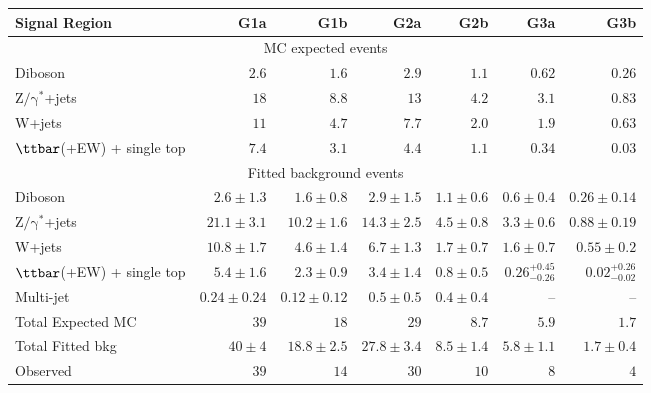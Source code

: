 \begin{table}[tbp]
\begin{center}
\begin{tabular}{|lrrrrrr|}
\hline
Signal Region & \textbf{ G1a } & \textbf{ G1b } & \textbf{ G2a } & \textbf{ G2b } & \textbf{ G3a } & \textbf{ G3b } \\
\hline
\multicolumn{7}{|c|}{MC expected events} \\ \hline
Diboson &  $2.6$               &  $1.6$               &  $2.9$               &  $1.1$               &  $0.62$               &  $0.26$               \\
$\mathrm{Z/\gamma^{*}}$+jets &  $18$               &  $8.8$               &  $13$               &  $4.2$               &  $3.1$               &  $0.83$               \\
W+jets &  $11$               &  $4.7$               &  $7.7$               &  $2.0$               &  $1.9$               &  $0.63$               \\
$\ttbar$(+EW) + single top &  $7.4$               &  $3.1$               &  $4.4$               &  $1.1$               &  $0.34$               &  $0.03$               \\
\hline
\multicolumn{7}{|c|}{Fitted background events} \\ \hline
Diboson & $2.6 \pm 1.3$ & $1.6 \pm 0.8$ & $2.9 \pm 1.5$ & $1.1 \pm 0.6$ & $0.6 \pm 0.4$ & $0.26 \pm 0.14$ \\
$\mathrm{Z/\gamma^{*}}$+jets & $21.1 \pm 3.1$ & $10.2 \pm 1.6$ & $14.3 \pm 2.5$ & $4.5 \pm 0.8$ & $3.3 \pm 0.6$ & $0.88 \pm 0.19$ \\
W+jets & $10.8 \pm 1.7$ & $4.6 \pm 1.4$ & $6.7 \pm 1.3$ & $1.7 \pm 0.7$ & $1.6 \pm 0.7$ & $0.55 \pm 0.2$ \\
$\ttbar$(+EW) + single top & $5.4 \pm 1.6$ & $2.3 \pm 0.9$ & $3.4 \pm 1.4$ & $0.8 \pm 0.5$ &  $0.26_{-0.26}^{+0.45}$               &  $0.02_{-0.02}^{+0.26}$               \\
Multi-jet & $0.24 \pm 0.24$ & $0.12 \pm 0.12$ & $0.5 \pm 0.5$ & $0.4 \pm 0.4$ & -- & -- \\
\hline
Total Expected MC &  $39$               &  $18$               &  $29$               &  $8.7$               &  $5.9$               &  $1.7$               \\
\hline
Total Fitted bkg & $40 \pm 4$ & $18.8 \pm 2.5$ & $27.8 \pm 3.4$ & $8.5 \pm 1.4$ & $5.8 \pm 1.1$ & $1.7 \pm 0.4$ \\
\hline
Observed &  $39$                     &  $14$                     &  $30$                     &  $10$                     &  $8$                     &  $4$                     \\
\hline



\end{tabular}
\end{center}
\end{table}

